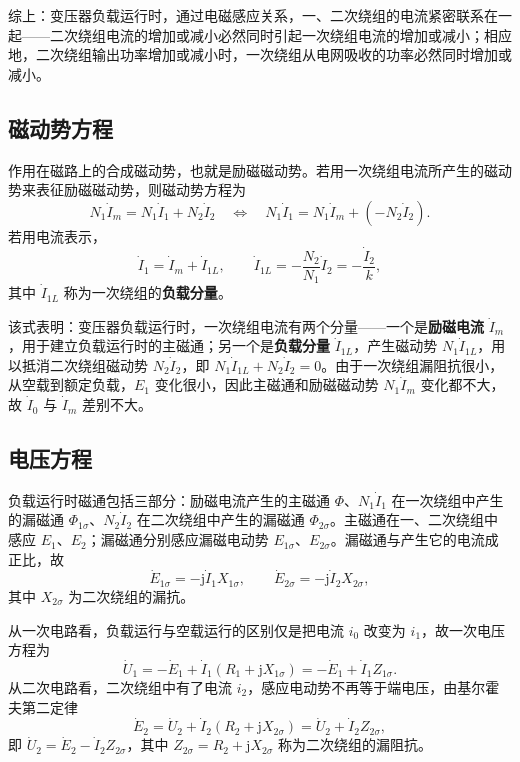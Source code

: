 综上：变压器负载运行时，通过电磁感应关系，一、二次绕组的电流紧密联系在一起——二次绕组电流的增加或减小必然同时引起一次绕组电流的增加或减小；相应地，二次绕组输出功率增加或减小时，一次绕组从电网吸收的功率必然同时增加或减小。

\subsection{磁动势方程}
作用在磁路上的合成磁动势，也就是励磁磁动势。若用一次绕组电流所产生的磁动势来表征励磁磁动势，则磁动势方程为
\begin{equation}
N_1\dot I_m=N_1\dot I_1+N_2\dot I_2
\quad\Longleftrightarrow\quad
N_1\dot I_1=N_1\dot I_m+\left(-N_2\dot I_2\right).
\end{equation}
若用电流表示，
\begin{equation}
\dot I_1=\dot I_m+\dot I_{1L},\qquad
\dot I_{1L}=-\frac{N_2}{N_1}\dot I_2=-\frac{\dot I_2}{k},
\end{equation}
其中 $\dot I_{1L}$ 称为一次绕组的\textbf{负载分量}。

该式表明：变压器负载运行时，一次绕组电流有两个分量——一个是\textbf{励磁电流} $\dot I_m$，用于建立负载运行时的主磁通；另一个是\textbf{负载分量} $\dot I_{1L}$，产生磁动势 $N_1\dot I_{1L}$，用以抵消二次绕组磁动势 $N_2\dot I_2$，即 $N_1\dot I_{1L}+N_2\dot I_2=0$。由于一次绕组漏阻抗很小，从空载到额定负载，$E_1$ 变化很小，因此主磁通和励磁磁动势 $N_1\dot I_m$ 变化都不大，故 $\dot I_0$ 与 $\dot I_m$ 差别不大。

\subsection{电压方程}
负载运行时磁通包括三部分：励磁电流产生的主磁通 $\Phi$、$N_1\dot I_1$ 在一次绕组中产生的漏磁通 $\Phi_{1\sigma}$、$N_2\dot I_2$ 在二次绕组中产生的漏磁通 $\Phi_{2\sigma}$。主磁通在一、二次绕组中感应 $E_1$、$E_2$；漏磁通分别感应漏磁电动势 $E_{1\sigma}$、$E_{2\sigma}$。漏磁通与产生它的电流成正比，故
\begin{equation}
\dot E_{1\sigma}=-\mathrm{j}\dot I_1X_{1\sigma},\qquad
\dot E_{2\sigma}=-\mathrm{j}\dot I_2X_{2\sigma},
\end{equation}
其中 $X_{2\sigma}$ 为二次绕组的漏抗。

从一次电路看，负载运行与空载运行的区别仅是把电流 $i_0$ 改变为 $i_1$，故一次电压方程为
\begin{equation}
\dot U_1=-\dot E_1+\dot I_1\left(R_1+\mathrm{j}X_{1\sigma}\right)=-\dot E_1+\dot I_1Z_{1\sigma}.
\end{equation}
从二次电路看，二次绕组中有了电流 $i_2$，感应电动势不再等于端电压，由基尔霍夫第二定律
\begin{equation}
\dot E_2=\dot U_2+\dot I_2\left(R_2+\mathrm{j}X_{2\sigma}\right)=\dot U_2+\dot I_2Z_{2\sigma},
\end{equation}
即 $\dot U_2=\dot E_2-\dot I_2Z_{2\sigma}$，其中 $Z_{2\sigma}=R_2+\mathrm{j}X_{2\sigma}$ 称为二次绕组的漏阻抗。


